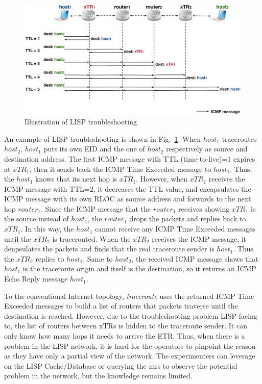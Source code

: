 \begin{figure}[!t]
	\centering
	\includegraphics[width=\textwidth]{Pics/LISP_traceroute.eps}
	\caption{Illustration of LISP troubleshooting}
	\label{Illustration_LISP_troubleshooting}
\end{figure}
An example of LISP troubleshooting is shown in Fig.~\ref{Illustration_LISP_troubleshooting}. When $host_1$ traceroutes $host_2$, $host_1$ puts its own EID and the one of $host_2$ respectively as source and destination address. The first ICMP message with TTL (time-to-live)=1 expires at $xTR_1$, then it sends back the ICMP Time Exceeded message to $host_1$. Thus, the $host_1$ knows that its next hop is $xTR_1$. However, when $xTR_1$ receives the ICMP message with TTL=2, it decreases the TTL value, and encapsulates the ICMP message with its own RLOC as source address and forwards to the next hop $router_1$. Since the ICMP message that the $router_1$ receives showing $xTR_1$ is the source instead of $host_1$, the $router_1$ drops the packets and replies back to $xTR_1$. In this way, the $host_1$ cannot receive any ICMP Time Exceeded messages until the $xTR_2$ is tracerouted. When the $xTR_2$ receives the ICMP message, it denpsulates the packets and finds that the real traceroute sender is $host_1$. Thus the $xTR_2$ replies to $host_1$. Same to $host_2$, the received ICMP message shows that $host_1$ is the traceroute origin and itself is the destination, so it returns an ICMP Echo Reply message $host_1$. 

To the conventional Internet topology, \emph{traceroute} uses the returned ICMP Time Exceeded messages to build a list of routers that packets traverse until the destination is reached. However, due to the troubleshooting problem LISP facing to, the list of routers between xTRs is hidden to the traceroute sender. It can only know how many hops it needs to arrive the ETR. Thus, when there is a problem in the LISP network, it is hard for the operators to pinpoint the reason as they have only a partial view of the network. The experimenters can leverage on the LISP Cache/Database or querying the \acrshort{mr}s to observe the potential problem in the network, but the knowledge remains limited. 

